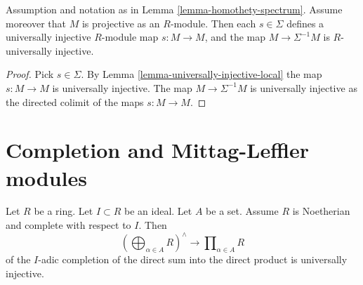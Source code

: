 \begin{lemma}
\label{lemma-invert-universally-injective}
Assumption and notation as in
Lemma \ref{lemma-homothety-spectrum}.
Assume moreover that $M$ is projective as an $R$-module.
Then each $s \in \Sigma$ defines a
universally injective $R$-module map $s : M \to M$, and the
map $M \to \Sigma^{-1}M$ is $R$-universally injective.
\end{lemma}

\begin{proof}
Pick $s \in \Sigma$. By
Lemma \ref{lemma-universally-injective-local}
the map $s : M \to M$ is universally injective.
The map $M \to \Sigma^{-1}M$ is universally injective as the directed
colimit of the maps $s : M \to M$.
\end{proof}






\section{Completion and Mittag-Leffler modules}
\label{section-completion-ML}

\begin{lemma}
\label{lemma-universally-injective-completion-direct-sum-into-product}
Let $R$ be a ring.
Let $I \subset R$ be an ideal.
Let $A$ be a set.
Assume $R$ is Noetherian and complete with respect to $I$. Then
$$
\left(\bigoplus\nolimits_{\alpha \in A} R\right)^\wedge
\longrightarrow
\prod\nolimits_{\alpha \in A} R
$$
of the $I$-adic completion of the direct sum into the
direct product is universally injective.
\end{lemma}

